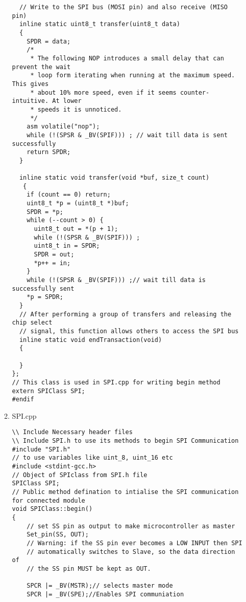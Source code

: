 \documentclass{article}
\begin{document}
\begin{itemize}
\begin{enumerate}
\begin{lstlisting}
  // Write to the SPI bus (MOSI pin) and also receive (MISO pin)
  inline static uint8_t transfer(uint8_t data) 
  {
    SPDR = data;
    /*
     * The following NOP introduces a small delay that can prevent the wait
     * loop form iterating when running at the maximum speed. This gives
     * about 10% more speed, even if it seems counter-intuitive. At lower
     * speeds it is unnoticed.
     */
    asm volatile("nop");
    while (!(SPSR & _BV(SPIF))) ; // wait till data is sent successfully
    return SPDR;
  }

  inline static void transfer(void *buf, size_t count)
   {
    if (count == 0) return;
    uint8_t *p = (uint8_t *)buf;
    SPDR = *p;
    while (--count > 0) {
      uint8_t out = *(p + 1);
      while (!(SPSR & _BV(SPIF))) ;
      uint8_t in = SPDR;
      SPDR = out;
      *p++ = in;
    }
    while (!(SPSR & _BV(SPIF))) ;// wait till data is successfully sent
    *p = SPDR;
  }
  // After performing a group of transfers and releasing the chip select 
  // signal, this function allows others to access the SPI bus
  inline static void endTransaction(void) 
  {
    
  }
};
// This class is used in SPI.cpp for writing begin method
extern SPIClass SPI;
#endif
\end{lstlisting}
\item SPI.cpp
\begin{lstlisting}
\\ Include Necessary header files
\\ Include SPI.h to use its methods to begin SPI Communication
#include "SPI.h"
// to use variables like uint_8, uint_16 etc
#include <stdint-gcc.h>
// Object of SPIclass from SPI.h file
SPIClass SPI;
// Public method defination to intialise the SPI communication 
for connected module
void SPIClass::begin()
{ 
	// set SS pin as output to make microcontroller as master
    Set_pin(SS, OUT);
    // Warning: if the SS pin ever becomes a LOW INPUT then SPI
    // automatically switches to Slave, so the data direction of
    // the SS pin MUST be kept as OUT.
    
    SPCR |= _BV(MSTR);// selects master mode
    SPCR |= _BV(SPE);//Enables SPI communiation


\end{lstlisting}
\end{enumerate}
\end{itemize}
\end{document}
